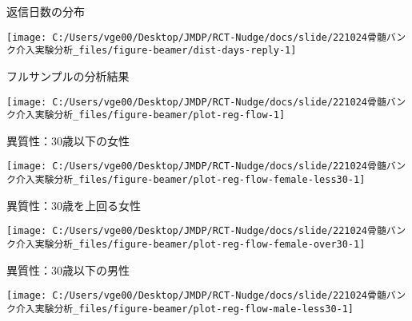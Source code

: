 \documentclass[
      aspectratio=169,
        12pt,
    ]{beamer}
\begin{document}
\begin{frame}{返信日数の分布}
\protect\hypertarget{ux8fd4ux4fe1ux65e5ux6570ux306eux5206ux5e03}{}
\begin{center}\texttt{[image: C:/Users/vge00/Desktop/JMDP/RCT-Nudge/docs/slide/221024骨髄バンク介入実験分析\_files/figure-beamer/dist-days-reply-1]} \end{center}
\end{frame}

\begin{frame}{フルサンプルの分析結果}
\protect\hypertarget{ux30d5ux30ebux30b5ux30f3ux30d7ux30ebux306eux5206ux6790ux7d50ux679c}{}
\begin{center}\texttt{[image: C:/Users/vge00/Desktop/JMDP/RCT-Nudge/docs/slide/221024骨髄バンク介入実験分析\_files/figure-beamer/plot-reg-flow-1]} \end{center}
\end{frame}

\begin{frame}{異質性：30歳以下の女性}
\protect\hypertarget{ux7570ux8ceaux602730ux6b73ux4ee5ux4e0bux306eux5973ux6027}{}
\begin{center}\texttt{[image: C:/Users/vge00/Desktop/JMDP/RCT-Nudge/docs/slide/221024骨髄バンク介入実験分析\_files/figure-beamer/plot-reg-flow-female-less30-1]} \end{center}
\end{frame}

\begin{frame}{異質性：30歳を上回る女性}
\protect\hypertarget{ux7570ux8ceaux602730ux6b73ux3092ux4e0aux56deux308bux5973ux6027}{}
\begin{center}\texttt{[image: C:/Users/vge00/Desktop/JMDP/RCT-Nudge/docs/slide/221024骨髄バンク介入実験分析\_files/figure-beamer/plot-reg-flow-female-over30-1]} \end{center}
\end{frame}

\begin{frame}{異質性：30歳以下の男性}
\protect\hypertarget{ux7570ux8ceaux602730ux6b73ux4ee5ux4e0bux306eux7537ux6027}{}
\begin{center}\texttt{[image: C:/Users/vge00/Desktop/JMDP/RCT-Nudge/docs/slide/221024骨髄バンク介入実験分析\_files/figure-beamer/plot-reg-flow-male-less30-1]} \end{center}
\end{frame}
\end{document}
